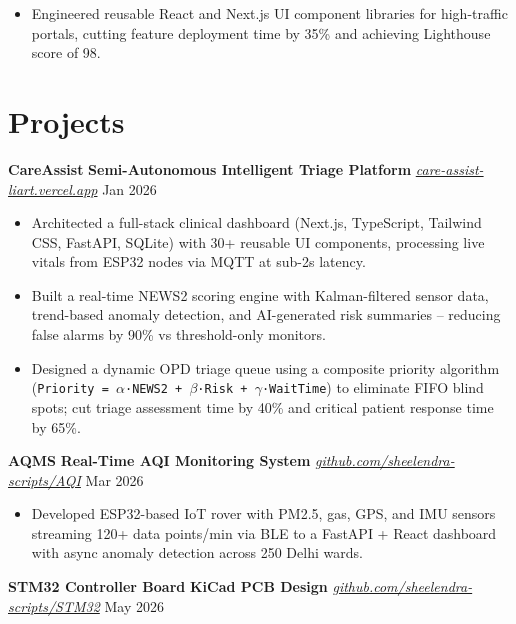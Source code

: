 \documentclass[10pt,letterpaper]{article}
\begin{document}
\begin{itemize}
    \item Engineered reusable React and Next.js UI component libraries for high-traffic portals, cutting feature deployment time by 35\% and achieving Lighthouse score of 98.
\end{itemize}

\section*{Projects}

\textbf{CareAssist} \textbar{} \textbf{Semi-Autonomous Intelligent Triage Platform} \textbar{} \textit{\href{https://care-assist-liart.vercel.app}{care-assist-liart.vercel.app}} \hfill Jan 2026

\begin{itemize}
    \item Architected a full-stack clinical dashboard (Next.js, TypeScript, Tailwind CSS, FastAPI, SQLite) with 30+ reusable UI components, processing live vitals from ESP32 nodes via MQTT at sub-2s latency.
    \item Built a real-time NEWS2 scoring engine with Kalman-filtered sensor data, trend-based anomaly detection, and AI-generated risk summaries -- reducing false alarms by 90\% vs threshold-only monitors.
    \item Designed a dynamic OPD triage queue using a composite priority algorithm (\texttt{Priority = $\alpha$·NEWS2 + $\beta$·Risk + $\gamma$·WaitTime}) to eliminate FIFO blind spots; cut triage assessment time by 40\% and critical patient response time by 65\%.
\end{itemize}

\vspace{1pt}

\textbf{AQMS} \textbar{} \textbf{Real-Time AQI Monitoring System} \textbar{} \textit{\href{https://github.com/sheelendra-scripts/AQI}{github.com/sheelendra-scripts/AQI}} \hfill Mar 2026

\begin{itemize}
    \item Developed ESP32-based IoT rover with PM2.5, gas, GPS, and IMU sensors streaming 120+ data points/min via BLE to a FastAPI + React dashboard with async anomaly detection across 250 Delhi wards.
\end{itemize}

\vspace{1pt}

\textbf{STM32 Controller Board} \textbar{} \textbf{KiCad PCB Design} \textbar{} \textit{\href{https://github.com/sheelendra-scripts/STM32}{github.com/sheelendra-scripts/STM32}} \hfill May 2026
\end{document}

